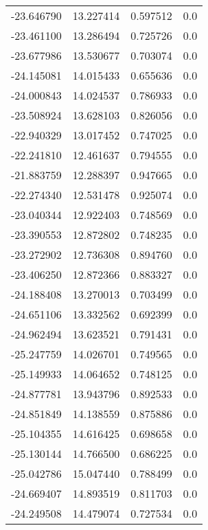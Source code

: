 \begin{tabular}{rrrr}
      -23.646790 &        13.227414 &    0.597512 &   0.0 \\
      -23.461100 &        13.286494 &    0.725726 &   0.0 \\
      -23.677986 &        13.530677 &    0.703074 &   0.0 \\
      -24.145081 &        14.015433 &    0.655636 &   0.0 \\
      -24.000843 &        14.024537 &    0.786933 &   0.0 \\
      -23.508924 &        13.628103 &    0.826056 &   0.0 \\
      -22.940329 &        13.017452 &    0.747025 &   0.0 \\
      -22.241810 &        12.461637 &    0.794555 &   0.0 \\
      -21.883759 &        12.288397 &    0.947665 &   0.0 \\
      -22.274340 &        12.531478 &    0.925074 &   0.0 \\
      -23.040344 &        12.922403 &    0.748569 &   0.0 \\
      -23.390553 &        12.872802 &    0.748235 &   0.0 \\
      -23.272902 &        12.736308 &    0.894760 &   0.0 \\
      -23.406250 &        12.872366 &    0.883327 &   0.0 \\
      -24.188408 &        13.270013 &    0.703499 &   0.0 \\
      -24.651106 &        13.332562 &    0.692399 &   0.0 \\
      -24.962494 &        13.623521 &    0.791431 &   0.0 \\
      -25.247759 &        14.026701 &    0.749565 &   0.0 \\
      -25.149933 &        14.064652 &    0.748125 &   0.0 \\
      -24.877781 &        13.943796 &    0.892533 &   0.0 \\
      -24.851849 &        14.138559 &    0.875886 &   0.0 \\
      -25.104355 &        14.616425 &    0.698658 &   0.0 \\
      -25.130144 &        14.766500 &    0.686225 &   0.0 \\
      -25.042786 &        15.047440 &    0.788499 &   0.0 \\
      -24.669407 &        14.893519 &    0.811703 &   0.0 \\
      -24.249508 &        14.479074 &    0.727534 &   0.0 \\

\end{tabular}
